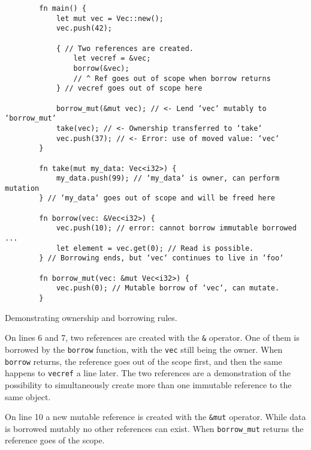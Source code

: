 \begin{listing}[!htbp]

    \centering
    \begin{verbatim}
        fn main() {
            let mut vec = Vec::new();
            vec.push(42);

            { // Two references are created.
                let vecref = &vec;
                borrow(&vec);
                // ^ Ref goes out of scope when borrow returns
            } // vecref goes out of scope here

            borrow_mut(&mut vec); // <- Lend ‘vec‘ mutably to ‘borrow_mut‘
            take(vec); // <- Ownership transferred to ‘take‘
            vec.push(37); // <- Error: use of moved value: ‘vec‘
        }

        fn take(mut my_data: Vec<i32>) {
            my_data.push(99); // ‘my_data‘ is owner, can perform mutation
        } // ‘my_data‘ goes out of scope and will be freed here

        fn borrow(vec: &Vec<i32>) {
            vec.push(10); // error: cannot borrow immutable borrowed ...
            let element = vec.get(0); // Read is possible.
        } // Borrowing ends, but ‘vec‘ continues to live in ‘foo‘

        fn borrow_mut(vec: &mut Vec<i32>) {
            vec.push(0); // Mutable borrow of ‘vec‘, can mutate.
        }
    \end{verbatim}

    \caption{Demonstrating ownership and borrowing rules.}
    \label{lst:ownership-and-borrowing}
\end{listing}

On lines 6 and 7, two references are created with the \texttt{&} operator. One of them is borrowed by the \texttt{borrow} function, with the \texttt{vec} still being the owner. When \texttt{borrow} returns, the reference goes out of the scope first, and then the same happens to \texttt{vecref} a line later. The two references are a demonstration of the possibility to simultaneously create more than one immutable reference to the same object.

On line 10 a new mutable reference is created with the \texttt{&mut} operator. While data is borrowed mutably no other references can exist. When \texttt{borrow_mut} returns the reference goes of the scope.

